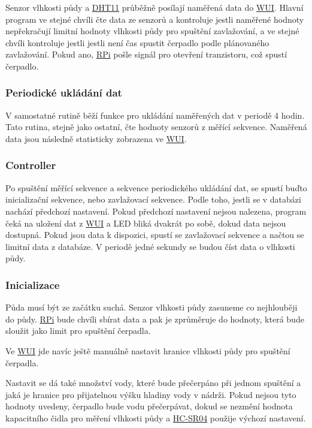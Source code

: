 \documentclass[czech,12pt,a4paper]{article}
\begin{document}
Senzor vlhkosti půdy a \underline{\ac{DHT11}} průběžně posílají naměřená data do \underline{\ac{WUI}}. Hlavní program ve stejné chvíli čte data ze senzorů a kontroluje jestli naměřené hodnoty nepřekračují limitní hodnoty vlhkosti půdy pro spuštění zavlažování, a ve stejné chvíli kontroluje jestli jestli není čas spustit čerpadlo podle plánovaného zavlažování. Pokud ano, \underline{\ac{RPi}} pošle signál pro otevření tranzistoru, což spustí čerpadlo.

\subsubsection{Periodické ukládání dat}

V samostatné rutině běží funkce pro ukládání naměřených dat v periodě 4 hodin. Tato rutina, stejně jako ostatní, čte hodnoty senzorů z měřící sekvence. Naměřená data jsou následně statisticky zobrazena ve \underline{\ac{WUI}}.

\subsubsection{Controller}

Po spuštění měřící sekvence a sekvence periodického ukládání dat, se spustí buďto inicializační sekvence, nebo zavlažovací sekvence. Podle toho, jestli se v databázi nachází předchozí nastavení. Pokud předchozí nastavení nejsou nalezena, program čeká na uložení dat z \space \underline{\ac{WUI}} a \ac{LED} bliká dvakrát po sobě, dokud data nejsou dostupná. Pokud jsou data k dispozici, spustí se zavlažovací sekvence a načtou se limitní data z databáze. V periodě jedné sekundy se budou číst data o vlhkosti půdy.

\subsubsection{Inicializace}

Půda musí být ze začátku suchá. Senzor vlhkosti půdy zasuneme co nejhlouběji do půdy. \underline{\ac{RPi}} bude chvíli sbírat data a pak je zprůměruje do hodnoty, která bude sloužit jako limit pro spuštění čerpadla.

Ve \underline{\ac{WUI}} jde navíc ještě manuálně nastavit hranice vlhkosti půdy pro spuštění čerpadla.

Nastavit se dá také množství vody, které bude přečerpáno při jednom spuštění a jaká je hranice pro přijatelnou výšku hladiny vody v nádrži. Pokud nejsou tyto hodnoty uvedeny, čerpadlo bude vodu přečerpávat, dokud se nezmění hodnota kapacitního čidla pro měření vlhkosti půdy a \space \underline{\ac{HC-SR04}} použije výchozí nastavení.
\end{document}

